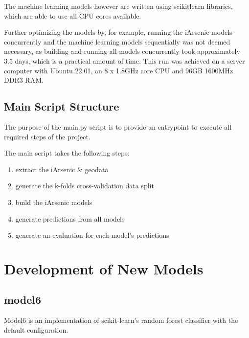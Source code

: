 The machine learning models however are written using scikitlearn libraries, which are able to use all CPU cores available. 

Further optimizing the models by, for example, running the iArsenic models concurrently and the machine learning models sequentially was not deemed necessary, as building and running all models concurrently took approximately 3.5 days, which is a practical amount of time. This run was achieved on a server computer with Ubuntu 22.01, an 8 x 1.8GHz core CPU and 96GB 1600MHz DDR3 RAM.

\subsection{Main Script Structure}

The purpose of the main.py script is to provide an entrypoint to execute all required steps of the project.

The main script takes the following steps:
\begin{enumerate}
    \item extract the iArsenic \& geodata
    \item generate the k-folds cross-validation data split 
    \item build the iArsenic models
    \item generate predictions from all models
    \item generate an evaluation for each model's predictions
\end{enumerate}

\section{Development of New Models}




\subsection{model6}

Model6 is an implementation of scikit-learn's random forest classifier with the default configuration.

